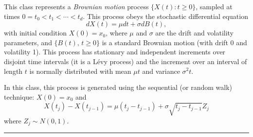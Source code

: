 
This class represents a \emph{Brownian motion} process $\{X(t) : t \geq 0 \}$,
sampled at times $0 = t_0 < t_1 < \cdots < t_d$.
This process obeys the stochastic differential equation
\begin{equation}
   dX(t) = \mu dt + \sigma dB(t),
                                               \label{eq:Brownian-motion}
\end{equation}
with initial condition $X(0)= x_0$,
where $\mu$ and $\sigma$ are the drift and volatility parameters,
and $\{B(t),\, t\ge 0\}$ is a standard Brownian motion
(with drift 0 and volatility 1).
This process has stationary and independent increments over disjoint
time intervals (it is a L\'evy process) and the increment over an interval
of length $t$ is normally distributed with mean $\mu t$ and variance $\sigma^2 t$.

In this class, this process is generated using the sequential (or random walk)
technique:  $X(0)=x_0$ and
\begin{equation}
   X(t_j) - X(t_{j-1}) = \mu(t_j - t_{j-1}) + \sigma \sqrt{t_j - t_{j-1}} Z_j
                                    \label{eq:Brownian-motion-sequential}
\end{equation}
where $Z_j \sim N(0,1)$.

\bigskip\hrule\bigskip

